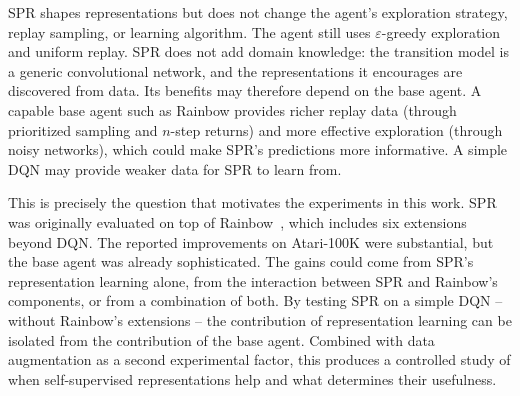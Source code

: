 \smallskip
SPR shapes representations but does not change the agent's
exploration strategy, replay sampling, or learning algorithm. The
agent still uses $\varepsilon$-greedy exploration and uniform
replay. SPR does not add domain knowledge: the transition model is
a generic convolutional network, and the representations it
encourages are discovered from data. Its benefits may therefore
depend on the base agent. A capable base agent such as Rainbow
provides richer replay data (through prioritized sampling and
$n$-step returns) and more effective exploration (through noisy
networks), which could make SPR's predictions more informative. A
simple DQN may provide weaker data for SPR to learn from.

\smallskip
This is precisely the question that motivates the experiments in
this work. SPR was originally evaluated on top of
Rainbow~\citep{hessel2018rainbow}, which includes six extensions
beyond DQN. The reported improvements on Atari-100K were
substantial, but the base agent was already sophisticated. The
gains could come from SPR's representation learning alone, from
the interaction between SPR and Rainbow's components, or from a
combination of both. By testing SPR on a simple DQN -- without
Rainbow's extensions -- the contribution of representation learning
can be isolated from the contribution of the base agent. Combined
with data augmentation as a second experimental factor, this
produces a controlled study of when self-supervised representations
help and what determines their usefulness.
